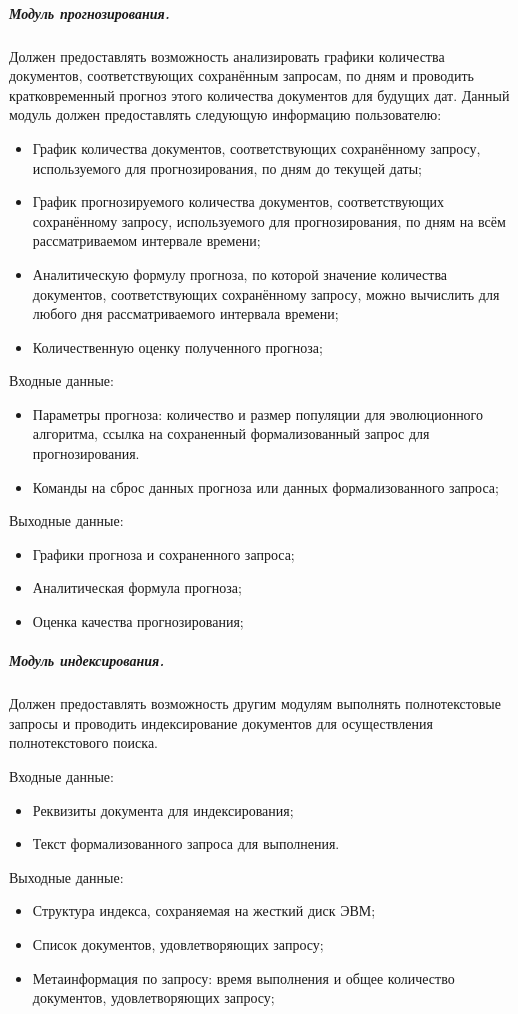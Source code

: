 \subparagraph{Модуль прогнозирования.} \hfill

Должен предоставлять возможность анализировать графики количества документов, соответствующих сохранённым запросам, по дням и проводить кратковременный прогноз этого количества документов для будущих дат. Данный модуль должен предоставлять следующую информацию пользователю:
\begin{itemize}
\item График количества документов, соответствующих сохранённому запросу, используемого для прогнозирования, по дням до текущей даты;
\item График прогнозируемого количества документов, соответствующих сохранённому запросу, используемого для прогнозирования, по дням на всём рассматриваемом интервале времени;
\item Аналитическую формулу прогноза, по которой значение количества документов, соответствующих сохранённому запросу, можно вычислить для любого дня рассматриваемого интервала времени;
\item Количественную оценку полученного прогноза;
\end{itemize}

Входные данные:
\begin{itemize}
\item Параметры прогноза: количество и размер популяции для эволюционного алгоритма, ссылка на сохраненный формализованный запрос для прогнозирования.
\item Команды на сброс данных прогноза или данных формализованного запроса;
\end{itemize}

Выходные данные:
\begin{itemize}
\item Графики прогноза и сохраненного запроса;
\item Аналитическая формула прогноза;
\item Оценка качества прогнозирования;
\end{itemize}

\subparagraph{Модуль индексирования.} \hfill

Должен предоставлять возможность другим модулям выполнять полнотекстовые запросы и проводить индексирование документов для осуществления полнотекстового поиска.

Входные данные:
\begin{itemize}
\item Реквизиты документа для индексирования;
\item Текст формализованного запроса для выполнения.
\end{itemize}

Выходные данные:
\begin{itemize}
\item Структура индекса, сохраняемая на жесткий диск ЭВМ;
\item Список документов, удовлетворяющих запросу;
\item Метаинформация по запросу: время выполнения и общее количество документов, удовлетворяющих запросу;
\end{itemize}